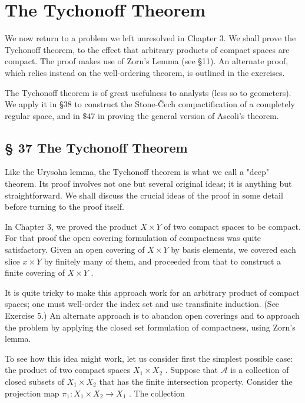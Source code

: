 \chapter{The Tychonoff Theorem}

We now return to a problem we left unresolved in Chapter 3. We shall prove the Tychonoff theorem, to the effect that arbitrary products of compact spaces are compact. The proof makes use of Zorn's Lemma (see §11). An alternate proof, which relies instead on the well-ordering theorem, is outlined in the exercises.

The Tychonoff theorem is of great usefulness to analysts (less so to geometers). We apply it in §38 to construct the Stone-Čech compactification of a completely regular space, and in \(\$ {47}\) in proving the general version of Ascoli’s theorem.

\section*{§ 37 The Tychonoff Theorem}

Like the Urysohn lemma, the Tychonoff theorem is what we call a "deep" theorem. Its proof involves not one but several original ideas; it is anything but straightforward. We shall discuss the crucial ideas of the proof in some detail before turning to the proof itself.

In Chapter 3, we proved the product \(X \times  Y\) of two compact spaces to be compact. For that proof the open covering formulation of compactness was quite satisfactory. Given an open covering of \(X \times  Y\) by basis elements, we covered each slice \(x \times  Y\) by finitely many of them, and proceeded from that to construct a finite covering of \(X \times  Y\) .

It is quite tricky to make this approach work for an arbitrary product of compact spaces; one must well-order the index set and use transfinite induction. (See Exercise 5.) An alternate approach is to abandon open coverings and to approach the problem by applying the closed set formulation of compactness, using Zorn's lemma.

To see how this idea might work, let us consider first the simplest possible case: the product of two compact spaces \({X}_{1} \times  {X}_{2}\) . Suppose that \(\mathcal{A}\) is a collection of closed subsets of \({X}_{1} \times  {X}_{2}\) that has the finite intersection property. Consider the projection map \({\pi }_{1} : {X}_{1} \times  {X}_{2} \rightarrow  {X}_{1}\) . The collection

